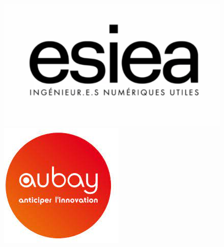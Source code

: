 \documentclass[11pt]{article}
\begin{document}
  \begin{titlepage}   
    \center 


    \begin{figure}[!tbp]
      \centering
      \begin{minipage}[t]{0.4\textwidth}
        \includegraphics[width=\textwidth]{Logo_ESIEA.jpg}    
      \end{minipage}
      \hfill 
      \begin{minipage}[t]{0.4\textwidth}
        \includegraphics[width=\textwidth]{Logo_Aubay.jpg}    
      \end{minipage}
    \end{figure}


\end{titlepage}
\end{document}
